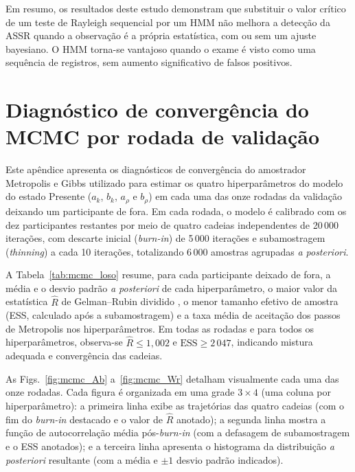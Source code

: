 \documentclass[conference]{IEEEtran}
\begin{document}
Em resumo, os resultados deste estudo demonstram que substituir o valor crítico de um teste de Rayleigh sequencial por um HMM não melhora a detecção da ASSR quando a observação é a própria estatística, com ou sem um ajuste bayesiano. O HMM torna-se vantajoso quando o exame é visto como uma sequência de registros, sem aumento significativo de falsos positivos. 




\clearpage
\appendices
\section{Diagnóstico de convergência do MCMC por rodada de validação}
\label{app:mcmc}

Este apêndice apresenta os diagnósticos de convergência do amostrador Metropolis e Gibbs utilizado para estimar os quatro hiperparâmetros do modelo do estado Presente ($a_k$, $b_k$, $a_\rho$ e $b_\rho$) em cada uma das onze rodadas da validação deixando um participante de fora. Em cada rodada, o modelo é calibrado com os dez participantes restantes por meio de quatro cadeias independentes de 20\,000 iterações, com descarte inicial (\textit{burn-in}) de 5\,000 iterações e subamostragem (\textit{thinning}) a cada 10 iterações, totalizando 6\,000 amostras agrupadas \textit{a posteriori}.

A Tabela~\ref{tab:mcmc_loso} resume, para cada participante deixado de fora, a média e o desvio padrão \textit{a posteriori} de cada hiperparâmetro, o maior valor da estatística $\hat{R}$ de Gelman--Rubin dividido \cite{gelman1992,gelman2013}, o menor tamanho efetivo de amostra (ESS, calculado após a subamostragem) e a taxa média de aceitação dos passos de Metropolis nos hiperparâmetros. Em todas as rodadas e para todos os hiperparâmetros, observa-se $\hat{R} \le 1{,}002$ e $\mathrm{ESS} \ge 2\,047$, indicando mistura adequada e convergência das cadeias.

As Figs.~\ref{fig:mcmc_Ab} a~\ref{fig:mcmc_Wr} detalham visualmente cada uma das onze rodadas. Cada figura é organizada em uma grade $3 \times 4$ (uma coluna por hiperparâmetro): a primeira linha exibe as trajetórias das quatro cadeias (com o fim do \textit{burn-in} destacado e o valor de $\hat{R}$ anotado); a segunda linha mostra a função de autocorrelação média pós-\textit{burn-in} (com a defasagem de subamostragem e o ESS anotados); e a terceira linha apresenta o histograma da distribuição \textit{a posteriori} resultante (com a média e $\pm 1$ desvio padrão indicados).
\end{document}
